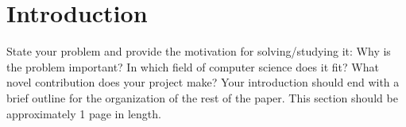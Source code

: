 \section{Introduction}

State your problem and provide the motivation for solving/studying it: Why is
the problem important? In which field of computer science does it fit?  What
novel contribution does your project make? Your introduction should end with a
brief outline for the organization of the rest of the paper. This section
should be approximately 1 page in length.